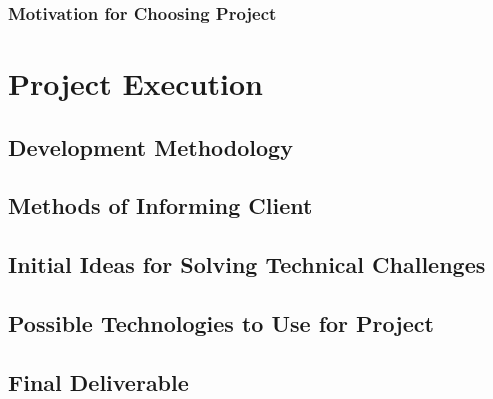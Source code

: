 \documentclass{article}
\begin{document}
		\subsubsection{Motivation for Choosing Project}

\cleardoublepage
    
\section{Project Execution}
	\subsection{Development Methodology}
	\subsection{Methods of Informing Client}
	\subsection{Initial Ideas for Solving Technical Challenges}
	\subsection{Possible Technologies to Use for Project}
	\subsection{Final Deliverable}
\end{document}
